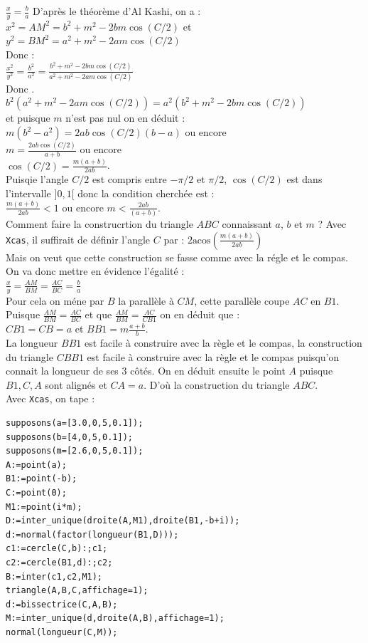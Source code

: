 \documentclass[a4paper,11pt]{book}
\newcommand{\acos}{\mbox{acos}}
\begin{document}
$\displaystyle \frac{x}{y}=\frac{b}{a}$
D'apr\`es le th\'eor\`eme d'Al Kashi, on a :\\
$x^2=AM^2=b^2+m^2-2bm\cos(C/2)$ et\\
$y^2=BM^2=a^2+m^2-2am\cos(C/2)$\\
Donc :\\
$\displaystyle \frac{x^2}{y^2}=\frac{b^2}{a^2}=\frac{b^2+m^2-2bm\cos(C/2)}{a^2+m^2-2am\cos(C/2)}$\\
Donc .\\
$b^2(a^2+m^2-2am\cos(C/2))=a^2(b^2+m^2-2bm\cos(C/2))$\\
et puisque $m$ n'est pas nul on en d\'eduit :\\
$m(b^2-a^2)=2ab\cos(C/2)(b-a)$ ou encore \\
$\displaystyle m=\frac{2ab\cos(C/2)}{a+b}$ ou encore \\
$\displaystyle \cos(C/2)=\frac{m(a+b)}{2ab}$.\\
Puisqie l'angle $C/2$ est compris entre $-\pi/2$ et $\pi/2$, $\cos(C/2)$ est dans l'intervalle $]0,1[$ donc la condition cherch\'ee est :\\
$\displaystyle  \frac{m(a+b)}{2ab}<1$ ou encore $\displaystyle m<\frac{2ab}{(a+b)}$.\\
Comment faire la construcrtion du triangle $ABC$ connaissant $a$, $b$ et $m$ ?
Avec {\tt Xcas}, il suffirait de d\'efinir l'angle $C$ par :
$\displaystyle 2\acos(\frac{m(a+b)}{2ab})$\\
Mais on veut que cette construction se fasse comme avec la r\'egle et le compas.
On va donc mettre en \'evidence l'\'egalit\'e :\\
$\displaystyle \frac{x}{y}=\frac{AM}{BM}=\frac{AC}{BC}=\frac{b}{a}$\\
Pour cela on m\'ene par $B$ la parall\`ele \`a $CM$, cette parall\`ele coupe 
$AC$ en $B1$. \\
Puisque $\displaystyle \frac{AM}{BM}=\frac{AC}{BC}$ et que 
$\displaystyle \frac{AM}{BM}=\frac{AC}{CB1}$ on en d\'eduit que :\\
$CB1=CB=a$ et $\displaystyle BB1=m\frac{a+b}{b}$.\\
La longueur $BB1$ est facile \`a construire avec la r\`egle et le compas, la 
construction du triangle  $CBB1$ est facile \`a construire avec la r\`egle et 
le compas puisqu'on connait la longueur de ses 3 c\^ot\'es.
On en d\'eduit ensuite le point $A$ puisque $B1,C,A$ sont align\'es et $CA=a$.
D'o\`u la construction du triangle $ABC$.\\
Avec {\tt Xcas}, on tape :
\begin{verbatim}
supposons(a=[3.0,0,5,0.1]);
supposons(b=[4,0,5,0.1]);
supposons(m=[2.6,0,5,0.1]);
A:=point(a);
B1:=point(-b);
C:=point(0);
M1:=point(i*m);
D:=inter_unique(droite(A,M1),droite(B1,-b+i));
d:=normal(factor(longueur(B1,D)));
c1:=cercle(C,b):;c1;
c2:=cercle(B1,d):;c2;
B:=inter(c1,c2,M1);
triangle(A,B,C,affichage=1);
d:=bissectrice(C,A,B);
M:=inter_unique(d,droite(A,B),affichage=1);
normal(longueur(C,M));
\end{verbatim}
\end{document}
